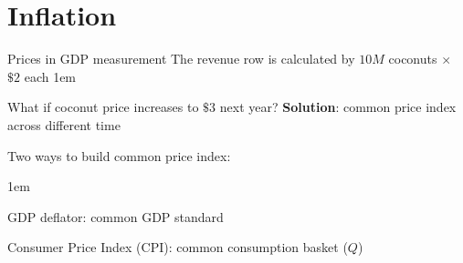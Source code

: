 \documentclass[11pt,aspectratio=43]{beamer}
\let\olditemize=\itemize
\let\endolditemize=\enditemize
\renewenvironment{itemize}{\olditemize \itemsep1em}{\endolditemize}
\let\oldenumerate=\enumerate
\let\endoldenumerate=\endenumerate
\renewenvironment{enumerate}{\oldenumerate \itemsep1em}{ \endoldenumerate}
\theoremstyle{definition}
\begin{document}
\section{Inflation}
\label{sec:Inflation}

\begin{frame}{Prices in GDP measurement}
\label{slide:Prices_in_GDP_measurement}
    The \alert{revenue} row is calculated by $ 10M $ coconuts $ \times $ $ \$2 $ each
    \begin{itemize}
        \item What if coconut price increases to $ \$3 $ next year?
    \end{itemize}
    \textbf{Solution}: common \alert{price index} across different time

    Two ways to build common price index:

    \begin{enumerate}
        \item GDP deflator: common \alert{GDP} standard
        \item Consumer Price Index (CPI): common \alert{consumption basket} ($Q$)
    \end{enumerate}
\end{frame}
\end{document}
